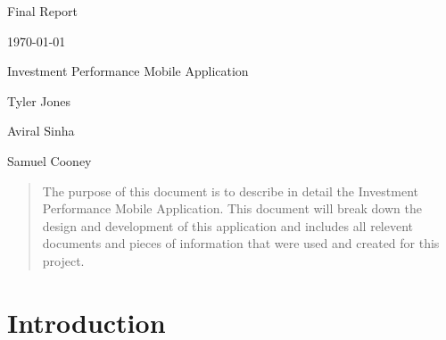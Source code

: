\documentclass[onecolumn, draftclsnofoot,10pt, compsoc]{IEEEtran}
\def \CapstoneTeamName{         Investment Performance Mobile Application}
\def \GroupMemberOne{                   Tyler Jones}
\def \GroupMemberTwo{                   Aviral Sinha}
\def \GroupMemberThree{                 Samuel Cooney}
\def \DocType{          %
                                Final Report
                                }
\newcommand{\NameSigPair}[1]{\par
\makebox[2.75in][r]{#1} \hfil   \makebox[3.25in]{\makebox[2.25in]{\hrulefill} \hfill            \makebox[.75in]{\hrulefill}}
\par\vspace{-12pt} \textit{\tiny\noindent
\makebox[2.75in]{} \hfil                \makebox[3.25in]{\makebox[2.25in][r]{Signature} \hfill  \makebox[.75in][r]{Date}}}}
\renewcommand{\NameSigPair}[1]{#1}
\begin{document}
\begin{titlepage}
    \begin{singlespace}
        \hfill
        \par\vspace{.2in}
        \centering
        \scshape{
            \huge \DocType \par
            {\large\today}\par
            \vfill
            \vspace{5pt}
            \CapstoneTeamName\par
            \vspace{5pt}
            {\Large
                \NameSigPair{\GroupMemberOne}\par
                \NameSigPair{\GroupMemberTwo}\par
                \NameSigPair{\GroupMemberThree}\par
            }
            \vspace{20pt}
        }
        \begin{abstract}
        The purpose of this document is to describe in detail the Investment Performance Mobile Application. This document will break down the design and development of this application and includes all relevent documents and pieces of information that were used and created for this project.
        \end{abstract}
    \end{singlespace}
\end{titlepage}
\newpage
{}
\tableofcontents
\clearpage
\newpage
{}

\section{Introduction}
\end{document}
